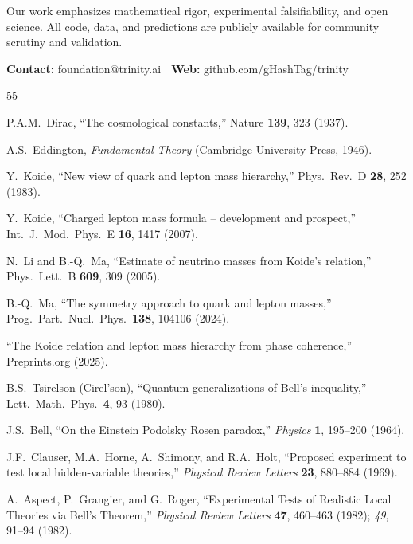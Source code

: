 \documentclass[aps,prd,preprint,superscriptaddress,showpacs,nofootinbib,longbibliography]{revtex4-2}
\begin{document}
Our work emphasizes mathematical rigor, experimental falsifiability, and open science. All code, data, and predictions are publicly available for community scrutiny and validation.

\textbf{Contact:} foundation@trinity.ai \quad | \quad \textbf{Web:} github.com/gHashTag/trinity


\begin{thebibliography}{55}

P.A.M.~Dirac,
``The cosmological constants,''
Nature \textbf{139}, 323 (1937).

A.S.~Eddington,
\textit{Fundamental Theory} (Cambridge University Press, 1946).

Y.~Koide,
``New view of quark and lepton mass hierarchy,''
Phys.\ Rev.\ D \textbf{28}, 252 (1983).

Y.~Koide,
``Charged lepton mass formula -- development and prospect,''
Int.\ J.\ Mod.\ Phys.\ E \textbf{16}, 1417 (2007).

N.~Li and B.-Q.~Ma,
``Estimate of neutrino masses from Koide's relation,''
Phys.\ Lett.\ B \textbf{609}, 309 (2005).

B.-Q.~Ma,
``The symmetry approach to quark and lepton masses,''
Prog.\ Part.\ Nucl.\ Phys.\ \textbf{138}, 104106 (2024).

``The Koide relation and lepton mass hierarchy from phase coherence,''
Preprints.org (2025).

B.S.~Tsirelson (Cirel'son),
``Quantum generalizations of Bell's inequality,''
Lett.\ Math.\ Phys.\ \textbf{4}, 93 (1980).

J.S.~Bell,
``On the Einstein Podolsky Rosen paradox,''
\textit{Physics} \textbf{1}, 195--200 (1964).

J.F.~Clauser, M.A.~Horne, A.~Shimony, and R.A.~Holt,
``Proposed experiment to test local hidden-variable theories,''
\textit{Physical Review Letters} \textbf{23}, 880--884 (1969).

A.~Aspect, P.~Grangier, and G.~Roger,
``Experimental Tests of Realistic Local Theories via Bell's Theorem,''
\textit{Physical Review Letters} \textbf{47}, 460--463 (1982);
\textit{49}, 91--94 (1982).


\end{thebibliography}
\end{document}

